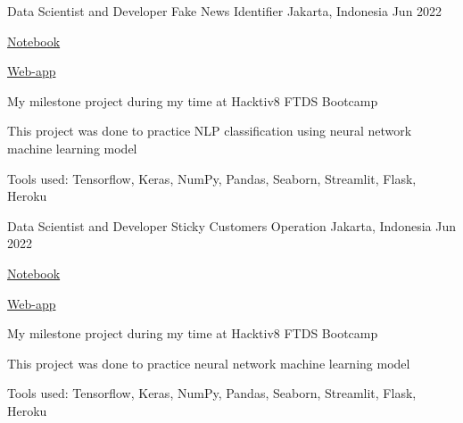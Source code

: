 

\begin{cventries}

  \cventry
    {Data Scientist and Developer} %
    {Fake News Identifier} %
    {Jakarta, Indonesia} %
    {Jun 2022} %
    {
      \begin{cvitems} %
        \item {\href{https://github.com/NikkiSatmaka/fake-news-identifier/blob/main/h8dsft_Milestone2P2_nikki_satmaka.ipynb}{Notebook}}
        \item {\href{https://fake-news-identifier.herokuapp.com/}{Web-app}}
        \item{My milestone project during my time at Hacktiv8 FTDS Bootcamp}
        \item{This project was done to practice NLP classification using neural network machine learning model}
        \item {Tools used: Tensorflow, Keras, NumPy, Pandas, Seaborn, Streamlit, Flask, Heroku}
      \end{cvitems}
    }

  \cventry
    {Data Scientist and Developer} %
    {Sticky Customers Operation} %
    {Jakarta, Indonesia} %
    {Jun 2022} %
    {
      \begin{cvitems} %
        \item {\href{https://github.com/NikkiSatmaka/fake-news-identifier/blob/main/h8dsft_Milestone2P2_nikki_satmaka.ipynb}{Notebook}}
        \item {\href{https://fake-news-identifier.herokuapp.com/}{Web-app}}
        \item {My milestone project during my time at Hacktiv8 FTDS Bootcamp}
        \item {This project was done to practice neural network machine learning model}
        \item {Tools used: Tensorflow, Keras, NumPy, Pandas, Seaborn, Streamlit, Flask, Heroku}
      \end{cvitems}
    }


\end{cventries}
